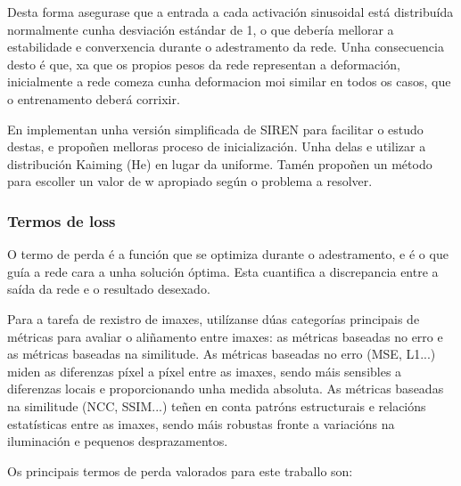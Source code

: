 Desta forma asegurase que a entrada a cada activación sinusoidal está distribuída normalmente cunha desviación estándar de 1,
 o que debería mellorar a estabilidade e converxencia durante o adestramento da rede.
Unha consecuencia desto é que, xa que os propios pesos da rede representan a deformación, inicialmente a rede comeza cunha deformacion moi similar en todos os casos, que o entrenamento deberá corrixir.

En \cite{sireninit} implementan unha versión simplificada de SIREN para facilitar o estudo destas, 
e propoñen melloras proceso de inicialización. Unha delas e utilizar a distribución Kaiming (He) en lugar da uniforme.
Tamén propoñen un método para escoller un valor de w apropiado según o problema a resolver.

\subsubsection{Termos de loss}
\label{subsubsec:Termos de loss}

O termo de perda é a función que se optimiza durante o adestramento, e é o que guía a rede cara a unha solución óptima.
Esta cuantifica a discrepancia entre a saída da rede e o resultado desexado.

Para a tarefa de rexistro de imaxes, utilízanse dúas categorías principais de métricas para avaliar o aliñamento entre imaxes: 
as métricas baseadas no erro e as métricas baseadas na similitude. As métricas baseadas no erro (MSE, L1...) miden as diferenzas píxel a píxel entre as imaxes, 
sendo máis sensibles a diferenzas locais e proporcionando unha medida absoluta. 
As métricas baseadas na similitude (NCC, SSIM...) teñen en conta patróns estructurais e relacións estatísticas entre as imaxes, sendo máis robustas fronte a variacións na iluminación e pequenos desprazamentos.
\cite{simmetric}

Os principais termos de perda valorados para este traballo son:

